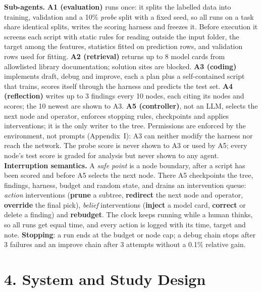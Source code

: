 \documentclass[11pt]{article}
\begin{document}
\textbf{Sub-agents.}
\textbf{A1 (evaluation)} runs once: it splits the labelled data into training,
validation and a 10\% \emph{probe} split with a fixed seed, so all runs on a task share
identical splits, writes the scoring harness and freezes it. Before execution it
screens each script with static rules for reading outside the input folder, the
target among the features, statistics fitted on prediction rows, and validation rows
used for fitting. \textbf{A2 (retrieval)} returns up to 8 model cards from allowlisted
library documentation; solution sites are blocked. \textbf{A3 (coding)} implements draft, debug and improve, each a plan plus a
self-contained script that trains, scores itself through the harness and predicts the
test set. \textbf{A4 (reflection)} writes up to 3 findings every 10 nodes, each citing
its nodes and scores; the 10 newest are shown to A3. \textbf{A5 (controller)}, not an
LLM, selects the next node and operator, enforces stopping rules, checkpoints and
applies interventions; it is the only writer to the tree. Permissions are enforced by
the environment, not prompts (Appendix~I): A3 can neither modify the harness nor reach
the network. The probe score is never shown to A3 or used
by A5; every node's test score is graded for analysis but never shown to any agent.
\textbf{Interruption semantics.} A \emph{safe point} is a node boundary, after a script
has been scored and before A5 selects the next node. There A5 checkpoints the tree,
findings, harness, budget and random state, and drains an intervention queue:
\emph{action} interventions (\textbf{prune} a subtree, \textbf{redirect} the next node
and operator, \textbf{override} the final pick), \emph{belief} interventions
(\textbf{inject} a model card, \textbf{correct} or delete a finding) and
\textbf{rebudget}. The clock keeps running while a human thinks, so all runs get equal
time, and every action is logged with its time, target and note.
\textbf{Stopping}: a run ends at the budget or node cap; a debug chain stops after 3
failures and an improve chain after 3 attempts without a 0.1\% relative gain.

\section*{4. System and Study Design}
\end{document}
